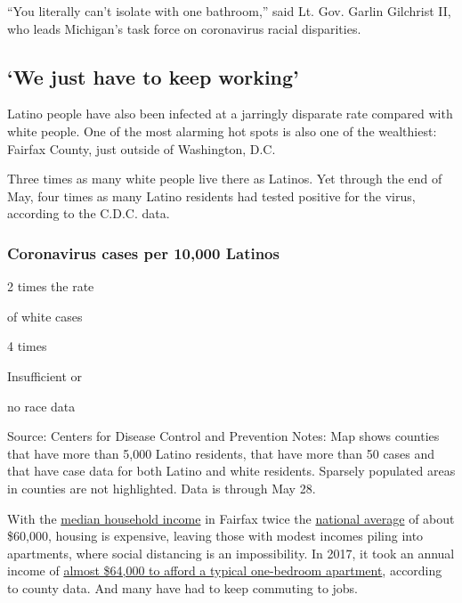 ``You literally can't isolate with one bathroom,'' said Lt. Gov. Garlin
Gilchrist II, who leads Michigan's task force on coronavirus racial
disparities.

\hypertarget{we-just-have-to-keep-working}{%
\subsection{`We just have to keep
working'}\label{we-just-have-to-keep-working}}

Latino people have also been infected at a jarringly disparate rate
compared with white people. One of the most alarming hot spots is also
one of the wealthiest: Fairfax County, just outside of Washington, D.C.

Three times as many white people live there as Latinos. Yet through the
end of May, four times as many Latino residents had tested positive for
the virus, according to the C.D.C. data.

\hypertarget{coronavirus-cases-per-10000-latinos}{%
\subsubsection{Coronavirus cases per 10,000
Latinos}\label{coronavirus-cases-per-10000-latinos}}

2 times the rate

of white cases

4 times

Insufficient or

no race data

Source: Centers for Disease Control and Prevention \textbar{} Notes: Map
shows counties that have more than 5,000 Latino residents, that have
more than 50 cases and that have case data for both Latino and white
residents. Sparsely populated areas in counties are not highlighted.
Data is through May 28.

With the
\href{https://www.census.gov/quickfacts/fairfaxcountyvirginia}{median
household income} in Fairfax twice the
\href{https://www.census.gov/quickfacts/fact/table/US/LFE305218\#LFE305218}{national
average} of about \$60,000, housing is expensive, leaving those with
modest incomes piling into apartments, where social distancing is an
impossibility. In 2017, it took an annual income of
\href{https://www.fairfaxcounty.gov/news2/who-we-are-in-fairfax-county-in-2018-annual-demographics-report/}{almost
\$64,000 to afford a typical one-bedroom apartment}, according to county
data. And many have had to keep commuting to jobs.

